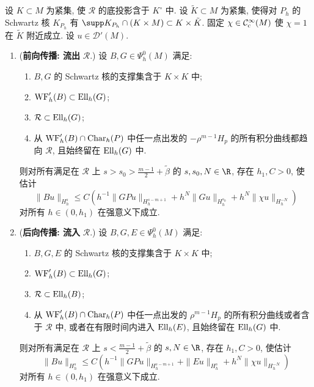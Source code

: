 \begin{theorem}\label{thm:10.17}
设 $K \subset M$ 为紧集, 使 $\mathcal{R}$ 的底投影含于 $K^\circ$ 中. 设 $\tilde{K} \subset M$ 为紧集, 使得对 $P_h$ 的 Schwartz 核 $K_{P_h}$ 有 $\supp K_{P_h} \cap (K \times M) \subset K \times \tilde{K}$. 固定 $\chi \in \mathcal{C}_{\mathrm{c}}^\infty(M)$ 使 $\chi = 1$ 在 $\tilde{K}$ 附近成立. 设 $u \in \mathcal{D}'(M)$.
\begin{enumerate}
    \item (\textbf{前向传播: 流出} $\mathcal{R}$.) 设 $B, G \in \Psi_h^0(M)$ 满足:
    \begin{enumerate}
        \item[(i)] $B, G$ 的 Schwartz 核的支撑集含于 $K \times K$ 中;
        \item[(ii)] $\operatorname{WF}_h'(B) \subset \operatorname{Ell}_h(G)$;
        \item[(iii)] $\mathcal{R} \subset \operatorname{Ell}_h(G)$;
        \item[(iv)] 从 $\operatorname{WF}_h'(B) \cap \operatorname{Char}_h(P)$ 中任一点出发的 $-\rho^{m-1}H_p$ 的所有积分曲线都趋向 $\mathcal{R}$, 且始终留在 $\operatorname{Ell}_h(G)$ 中.
    \end{enumerate}
    则对所有满足在 $\mathcal{R}$ 上 $s > s_0 > \frac{m-1}{2} + \tilde{\beta}$ 的 $s, s_0, N \in \R$, 存在 $h_1, C > 0$, 使估计
    \begin{equation}\label{eq:10.63}
        \|B u\|_{H_h^s} \le C\left( h^{-1}\|G P u\|_{H_h^{s-m+1}} + h^N \|G u\|_{H_h^{s_0}} + h^N \|\chi u\|_{H_h^{-N}} \right)
    \end{equation}
    对所有 $h \in (0, h_1)$ 在强意义下成立.
    \item (\textbf{后向传播: 流入} $\mathcal{R}$.) 设 $B, G, E \in \Psi_h^0(M)$ 满足:
    \begin{enumerate}
        \item[(i)] $B, G, E$ 的 Schwartz 核的支撑集含于 $K \times K$ 中;
        \item[(ii)] $\operatorname{WF}_h'(B) \subset \operatorname{Ell}_h(G)$;
        \item[(iii)] $\mathcal{R} \subset \operatorname{Ell}_h(B)$;
        \item[(iv)] 从 $\operatorname{WF}_h'(B) \cap \operatorname{Char}_h(P)$ 中任一点出发的 $\rho^{m-1}H_p$ 的所有积分曲线或者含于 $\mathcal{R}$ 中, 或者在有限时间内进入 $\operatorname{Ell}_h(E)$, 且始终留在 $\operatorname{Ell}_h(G)$ 中.
    \end{enumerate}
    则对所有满足在 $\mathcal{R}$ 上 $s < \frac{m-1}{2} + \tilde{\beta}$ 的 $s, N \in \R$, 存在 $h_1, C > 0$, 使估计
    \begin{equation}\label{eq:10.64}
        \|B u\|_{H_h^s} \le C\left( h^{-1}\|G P u\|_{H_h^{s-m+1}} + \|E u\|_{H_h^s} + h^N \|\chi u\|_{H_h^{-N}} \right)
    \end{equation}
    对所有 $h \in (0, h_1)$ 在强意义下成立.
\end{enumerate}
\end{theorem}

